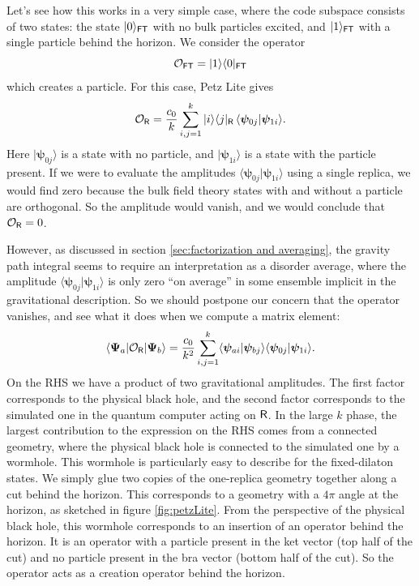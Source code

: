 \documentclass[11pt]{article}
\newcommand{\be}{\begin{equation}}
\newcommand{\ee}{\end{equation}}
\numberwithin{equation}{section}
\begin{document}
Let's see how this works in a very simple case, where the code subspace consists of two states: the state $|0\rangle_{\sf{FT}}$ with no bulk particles excited, and $|1\rangle_{\sf{FT}}$ with a single particle behind the horizon. We consider the operator
\be
\mathcal{O}_{\sf{FT}} = |1\rangle\langle 0|\label{example1}_{\sf{FT}}
\ee
which creates a particle. For this case, Petz Lite gives
\be
\mathcal{O}_{\sf{R}} = \frac{c_0}{k}\sum_{i,j=1}^k |i\rangle\langle j|_{\sf{R}}\,\langle\bm{\psi}_{0j}|\bm{\psi}_{1i}\rangle.
\ee
Here $|\bm{\psi}_{0j}\rangle$ is a state with no particle, and $|\bm{\psi}_{1i}\rangle$ is a state with the particle present. If we were to evaluate the amplitudes $\langle\bm{\psi}_{0j}|\bm{\psi}_{1i}\rangle$ using a single replica, we would find zero because the bulk field theory states with and without a particle are orthogonal. So the amplitude would vanish, and we would conclude that $\mathcal{O}_{\sf{R}} = 0$. 

However, as discussed  in section \ref{sec:factorization and averaging}, the gravity path integral seems to require an interpretation as a disorder average, where the amplitude $\langle\bm{\psi}_{0j}|\bm{\psi}_{1i}\rangle$ is only zero ``on average'' in some ensemble implicit in the gravitational description. So we should postpone our concern that the operator vanishes, and see what it does when we compute a matrix element:
\be
\langle \bm{\Psi}_a|\mathcal{O}_{\sf{R}}|\bm{\Psi}_b\rangle = \frac{c_0}{k^2}\sum_{i,j=1}^k\langle \bm{\psi}_{ai}|\bm{\psi}_{bj}\rangle\langle \bm{\psi}_{0j}|\bm{\psi}_{1i}\rangle.\label{PetzLiteexp}
\ee
On the RHS we have a product of two gravitational amplitudes. The first factor corresponds to the physical black hole, and the second factor corresponds to the simulated one in the quantum computer acting on ${\sf{R}}$. In the large $k$ phase, the largest contribution to the expression on the RHS comes from a connected geometry, where the physical black hole is connected to the simulated one by a wormhole. This wormhole is particularly easy to describe for the fixed-dilaton states. We simply glue two copies of the one-replica geometry together along a cut behind the horizon. This corresponds to a geometry with a $4\pi$ angle at the horizon, as sketched in figure \ref{fig:petzLite}. From the perspective of the physical black hole, this wormhole corresponds to an insertion of an operator behind the horizon. It is an operator with a particle present in the ket vector (top half of the cut) and no particle present in the bra vector (bottom half of the cut). So the operator acts as a creation operator behind the horizon.
\end{document}
